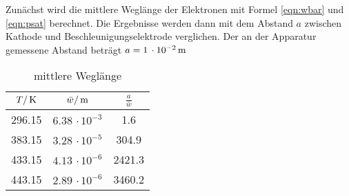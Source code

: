 Zunächst wird die mittlere Weglänge der Elektronen mit Formel \eqref{eqn:wbar}
und \eqref{eqn:psat} berechnet. Die Ergebnisse werden dann mit dem Abstand $a$
zwischen Kathode und Beschleunigungselektrode verglichen. Der an der Apparatur
gemessene Abstand beträgt $a=1\,\cdot10^{-2}\,\si{\meter}$
\begin{table}
  \centering
  \begin{tabular}{ccc}
    \toprule
    $T/\,\si{\kelvin}$ & $\bar w/\,\si{\meter}$ & $\frac{a}{\bar w}$ \\
    \midrule
     296.15 & $6.38\,\cdot 10^{-3}$ &    1.6  \\
     383.15 & $3.28\,\cdot 10^{-5}$ &  304.9  \\
     433.15 & $4.13\,\cdot 10^{-6}$ & 2421.3  \\
     443.15 & $2.89\,\cdot 10^{-6}$ & 3460.2  \\
    \bottomrule
  \end{tabular}
  \caption{mittlere Weglänge}
  \label{tab:weg}
\end{table}
